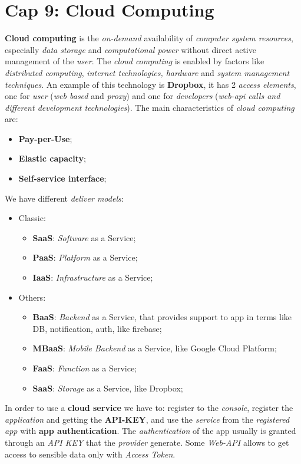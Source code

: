 \documentclass{article}
\begin{document}
\section{Cap 9: Cloud Computing}
\textbf{Cloud computing} is the \emph{on-demand} availability of \emph{computer system resources}, especially \emph{data storage} and \emph{computational power} without direct active management of the \emph{user}. The \emph{cloud computing} is enabled by factors like \emph{distributed computing}, \emph{internet technologies, hardware} and \emph{system management techniques}. An example of this technology is \textbf{Dropbox}, it has 2 \emph{access elements}, one for \emph{user} (\emph{web based} and \emph{proxy}) and one for \emph{developers} (\emph{web-api calls and different development technologies}). The main characteristics of \emph{cloud computing} are:
\begin{itemize}
\item\textbf{ Pay-per-Use};
\item \textbf{Elastic capacity};
\item \textbf{Self-service interface};
\end{itemize}
We have different \emph{deliver models}:
\begin{itemize}
\item Classic:
\begin{itemize}
\item \textbf{SaaS}: \emph{Software} as a Service;
\item \textbf{PaaS}: \emph{Platform} as a Service;
\item \textbf{IaaS}: \emph{Infrastructure} as a Service;
\end{itemize}
\item Others:
\begin{itemize}
\item \textbf{BaaS}: \emph{Backend} as a Service, that provides support to app in terms like DB, notification, auth, like firebase;
\item \textbf{MBaaS}: \emph{Mobile Backend} as a Service, like Google Cloud Platform;
\item \textbf{FaaS}: \emph{Function} as a Service;
\item \textbf{SaaS}: \emph{Storage} as a Service, like Dropbox;
\end{itemize}
\end{itemize}
In order to use a \textbf{cloud service} we have to: register to the \emph{console}, register the \emph{application} and getting the \textbf{API-KEY}, and use the \emph{service} from the \emph{registered app} with \textbf{app authentication}. The \emph{authentication} of the app usually is granted through an \emph{API KEY} that the \emph{provider} generate. Some \emph{Web-API }allows to get access to sensible data only with \emph{Access Token}. \\\\
\end{document}

